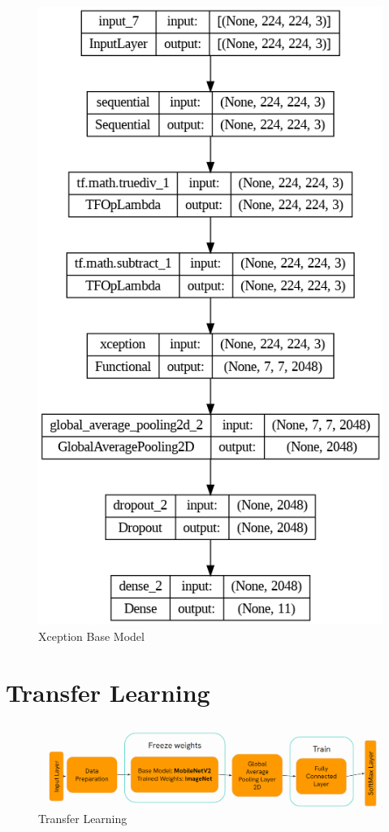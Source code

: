 \begin{figure}
    \centering
    \includegraphics[height=\textheight]{graphics//chapter5/xception base model graph.png}
    \caption{Xception Base Model}
    \label{fig:xception-base-model}
\end{figure}


\section{Transfer Learning}\label{Transfer-learning-section}

\begin{figure}
    \centering
    \includegraphics[width=\linewidth]{graphics//chapter5/transfer learning.png}
    \caption{Transfer Learning}
    \label{fig:transfer-learning}
\end{figure}

